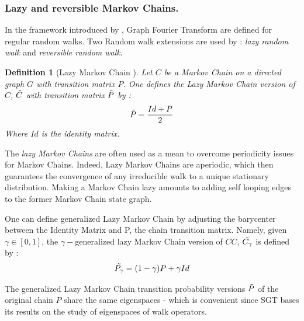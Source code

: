 \documentclass[sn-mathphys]{sn-jnl}%
\theoremstyle{thmstyleone}%
\theoremstyle{thmstyletwo}%
\theoremstyle{thmstylethree}%
\newtheorem{definition}[theo]{Definition}
\begin{document}
\subsubsection{Lazy and reversible Markov Chains.}
In the framework introduced by \cite{sevi2019}, Graph Fourier
Transform are defined for regular random walks. Two Random walk
extensions are used by \cite{sevi2019} : \textit{lazy random walk} and
\textit{reversible random walk}.

\begin{definition}[Lazy Markov Chain \cite{sevi2019}]
  Let $C$ be a Markov Chain on a directed graph $G$ with transition
  matrix $P$. One defines the Lazy Markov Chain version of $C$,
  $\Tilde{C}$ with transition matrix $\Tilde{P}$ by :
\begin{equation}
    \Tilde{P} = \frac{Id + P}{2}
\end{equation}
Where $Id$ is the identity matrix.

\end{definition}

The \textit{lazy Markov Chains} are often used as a mean to overcome
periodicity issues for Markov Chains. Indeed, Lazy Markov Chains are
aperiodic, which then guarantees the convergence of any irreducible
walk to a unique stationary distribution. Making a Markov Chain lazy
amounts to adding self looping edges to the former Markov Chain state
graph.

One can define generalized Lazy Markov Chain by adjusting the
barycenter between the Identity Matrix and P, the chain transition
matrix. Namely, given $\gamma \in [0,1]$, the $\gamma-$generalized
lazy Markov Chain version of $CC$, $\Tilde{C_{\gamma}}$ is defined by
:
\begin{equation}
    \Tilde{P_\gamma} = (1-\gamma) P + \gamma Id
\end{equation}

The generalized Lazy Markov Chain transition probability versions
$\Tilde{P}$ of the original chain $P$ share the same eigenspaces -
which is convenient since SGT bases its results on the study of
eigenspaces of walk operators.
\end{document}
